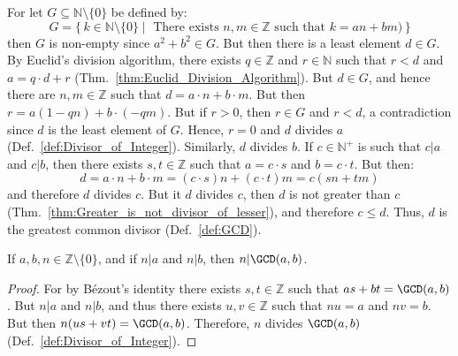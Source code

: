 \documentclass{article}                                                        %
\begin{document}
            \begin{bproof}
                For let $G\subseteq\mathbb{N}\setminus\{0\}$ be defined by:
                \begin{equation}
                    G=\{\,k\in\mathbb{N}\setminus\{0\}\;|\;
                        \textrm{ There exists } n,m\in\mathbb{Z}\textrm{ such that }
                            k=an+bm\big)\,\}
                \end{equation}
                then $G$ is non-empty since $a^{2}+b^{2}\in{G}$. But then there is a
                least element $d\in{G}$. By Euclid's division algorithm, there
                exists $q\in\mathbb{Z}$ and $r\in\mathbb{N}$ such that $r<d$ and
                $a=q\cdot{d}+r$ (Thm.~\ref{thm:Euclid_Division_Algorithm}). But
                $d\in{G}$, and hence there are $n,m\in\mathbb{Z}$ such that
                $d=a\cdot{n}+b\cdot{m}$. But then $r=a(1-qn)+b\cdot(\minus{q}m)$.
                But if $r>0$, then $r\in{G}$ and $r<d$, a contradiction since $d$ is
                the least element of $G$. Hence, $r=0$ and $d$ divides $a$
                (Def.~\ref{def:Divisor_of_Integer}). Similarly, $d$ divides $b$.
                If $c\in\mathbb{N}^{+}$ is such that $c|a$ and $c|b$, then there
                exists $s,t\in\mathbb{Z}$ such that $a=c\cdot{s}$ and $b=c\cdot{t}$.
                But then:
                \begin{equation}
                    d=a\cdot{n}+b\cdot{m}=(c\cdot{s})n+(c\cdot{t})m=c(sn+tm)
                \end{equation}
                and therefore $d$ divides $c$. But it $d$ divides $c$, then
                $d$ is not greater than $c$
                (Thm.~\ref{thm:Greater_is_not_divisor_of_lesser}), and therefore
                $c\leq{d}$. Thus, $d$ is the greatest common divisor
                (Def.~\ref{def:GCD}).
            \end{bproof}
            \begin{theorem}
                \label{thm:Divisor_of_AB_Divides_GCD}%
                If $a,b,n\in\mathbb{Z}\setminus\{0\}$, and if $n|a$ and $n|b$, then
                $n|\GCD(a,b)$.
            \end{theorem}
            \begin{proof}
                For by B\'{e}zout's identity there exists $s,t\in\mathbb{Z}$ such
                that $as+bt=\GCD(a,b)$. But $n|a$ and $n|b$, and thus there exists
                $u,v\in\mathbb{Z}$ such that $nu=a$ and $nv=b$. But then
                $n(us+vt)=\GCD(a,b)$. Therefore, $n$ divides $\GCD(a,b)$
                (Def.~\ref{def:Divisor_of_Integer}).
            \end{proof}
\end{document}

